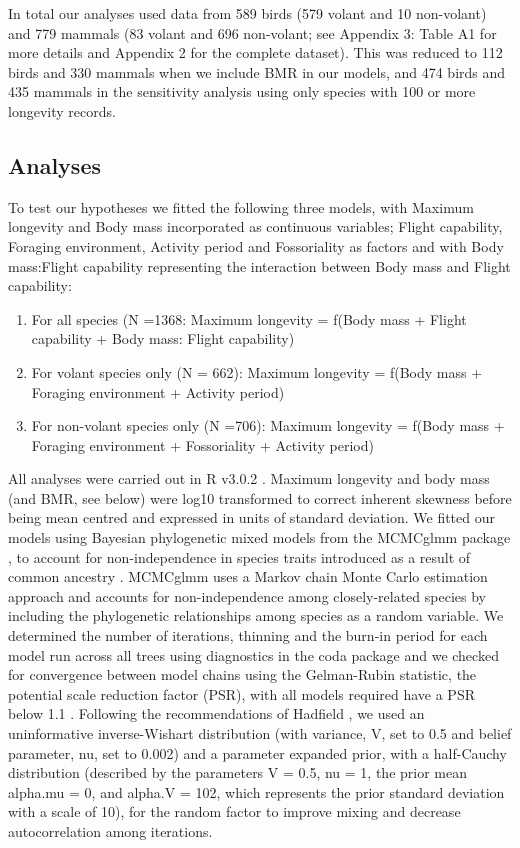 In total our analyses used data from 589 birds (579 volant and 10 non-volant) and 779 mammals (83 volant and 696 non-volant; see Appendix 3: Table A1 for more details and Appendix 2 for the complete dataset). This was reduced to 112 birds and 330 mammals when we include BMR in our models, and 474 birds and 435 mammals in the sensitivity analysis using only species with 100 or more longevity records.

\subsection{Analyses}

To test our hypotheses we fitted the following three models, with Maximum longevity and Body mass incorporated as continuous variables; Flight capability, Foraging environment, Activity period and Fossoriality as factors and with Body mass:Flight capability representing the interaction between Body mass and Flight capability:


\begin{enumerate}
  \item For all species (N =1368:
Maximum longevity = f(Body mass +  Flight capability + Body mass: Flight capability)
  \item For volant species only (N = 662):
Maximum longevity = f(Body mass + Foraging environment + Activity period)
  \item For non-volant species only (N =706):
Maximum longevity = f(Body mass +  Foraging environment + Fossoriality + Activity period)
\end{enumerate}


All analyses were carried out in R v3.0.2 \citep{RCran}. Maximum longevity and body mass (and BMR, see below) were log10 transformed to correct inherent skewness before being mean centred and expressed in units of standard deviation.
We fitted our models using Bayesian phylogenetic mixed models from the MCMCglmm package \citep{hadfield2010mcmc}, to account for non-independence in species traits introduced as a result of common ancestry \citep{harvey1991comparative}. MCMCglmm uses a Markov chain Monte Carlo estimation approach and accounts for non-independence among closely-related species by including the phylogenetic relationships among species as a random variable. We determined the number of iterations, thinning and the burn-in period for each model run across all trees using diagnostics in the coda package \citep{plummer2006coda} and we checked for convergence between model chains using the Gelman-Rubin statistic, the potential scale reduction factor (PSR), with all models required have a PSR below  1.1 \citep{gelman1992inference}. Following the recommendations of Hadfield \citep{hadfield2010mcmc}, we used an uninformative inverse-Wishart distribution (with variance, V, set to 0.5 and belief parameter, nu, set to 0.002) and a parameter expanded prior, with a half-Cauchy distribution (described by the parameters V = 0.5, nu = 1, the prior mean alpha.mu = 0, and alpha.V = 102, which represents the prior standard deviation with a scale of 10), for the random factor to improve mixing and decrease autocorrelation among iterations. 

